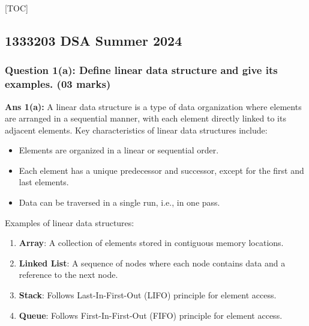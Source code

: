 {[}TOC{]}

\hypertarget{dsa-summer-2024}{%
\subsection{1333203 DSA Summer 2024}\label{dsa-summer-2024}}

\hypertarget{question-1a-define-linear-data-structure-and-give-its-examples.-03-marks}{%
\subsubsection{Question 1(a): Define linear data structure and give its
examples. (03
marks)}\label{question-1a-define-linear-data-structure-and-give-its-examples.-03-marks}}

\textbf{Ans 1(a):} A linear data structure is a type of data
organization where elements are arranged in a sequential manner, with
each element directly linked to its adjacent elements. Key
characteristics of linear data structures include:

\begin{itemize}
\tightlist
\item
  Elements are organized in a linear or sequential order.
\item
  Each element has a unique predecessor and successor, except for the
  first and last elements.
\item
  Data can be traversed in a single run, i.e., in one pass.
\end{itemize}

Examples of linear data structures:

\begin{enumerate}
\def\labelenumi{\arabic{enumi}.}
\tightlist
\item
  \textbf{Array}: A collection of elements stored in contiguous memory
  locations.
\item
  \textbf{Linked List}: A sequence of nodes where each node contains
  data and a reference to the next node.
\item
  \textbf{Stack}: Follows Last-In-First-Out (LIFO) principle for element
  access.
\item
  \textbf{Queue}: Follows First-In-First-Out (FIFO) principle for
  element access.
\end{enumerate}

